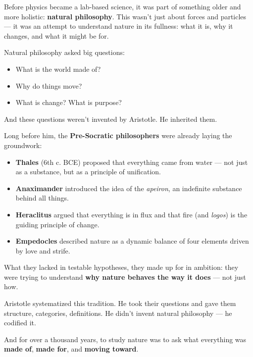 \begin{tcolorbox}[title=Historical Sidebar: Before Science Had Equations It Had Natural Philosophy, colback=gray!5, colframe=black, fonttitle=\bfseries]

  Before physics became a lab-based science, it was part of something older and more holistic: \textbf{natural philosophy}. This wasn’t just about forces and particles — it was an attempt to understand nature in its fullness: what it is, why it changes, and what it might be for.

  \medskip
  
  Natural philosophy asked big questions:

  \medskip

  \begin{itemize}
      \item What is the world made of?
      \item Why do things move?
      \item What is change? What is purpose?
  \end{itemize}

  \medskip
  
  And these questions weren’t invented by Aristotle. He inherited them.

  \medskip
  
  Long before him, the \textbf{Pre-Socratic philosophers} were already laying the groundwork:

  \medskip
  
  \begin{itemize}
      \item \textbf{Thales} (6th c. BCE) proposed that everything came from water — not just as a substance, but as a principle of unification.
      \item \textbf{Anaximander} introduced the idea of the \textit{apeiron}, an indefinite substance behind all things.
      \item \textbf{Heraclitus} argued that everything is in flux and that fire (and \textit{logos}) is the guiding principle of change.
      \item \textbf{Empedocles} described nature as a dynamic balance of four elements driven by love and strife.
  \end{itemize}

  \medskip
  
  What they lacked in testable hypotheses, they made up for in ambition: they were trying to understand \textbf{why nature behaves the way it does} — not just how.
  
  \medskip
  
  Aristotle systematized this tradition. He took their questions and gave them structure, categories, definitions. He didn’t invent natural philosophy — he codified it.

  \medskip
  
  And for over a thousand years, to study nature was to ask what everything was \textbf{made of}, \textbf{made for}, and \textbf{moving toward}.
  
\end{tcolorbox}

